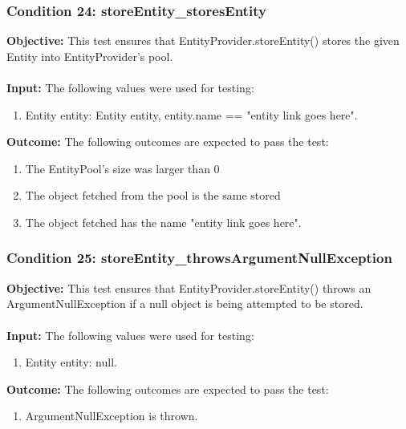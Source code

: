 \documentclass[a4paper,12pt]{article}
\begin{document}
		\subsubsection{Condition 24: storeEntity\_storesEntity}
			\textbf{Objective:} This test ensures that EntityProvider.storeEntity() stores the given Entity into EntityProvider's pool.\\\\
			\textbf{Input:} The following values were used for testing:
				\begin{enumerate}
					\item Entity entity: Entity entity, entity.name == "entity link goes here".
				\end{enumerate}
			\textbf{Outcome:} The following outcomes are expected to pass the test:
				\begin{enumerate}
					\item The EntityPool's size was larger than 0
					\item The object fetched from the pool is the same stored
					\item The object fetched has the name "entity link goes here".
				\end{enumerate}
		\subsubsection{Condition 25: storeEntity\_throwsArgumentNullException}
			\textbf{Objective:} This test ensures that EntityProvider.storeEntity() throws an ArgumentNullException if a null object is being attempted to be stored.\\\\
			\textbf{Input:} The following values were used for testing:
				\begin{enumerate}
					\item Entity entity: null.
				\end{enumerate}
			\textbf{Outcome:} The following outcomes are expected to pass the test:
				\begin{enumerate}
					\item ArgumentNullException is thrown.
				\end{enumerate}
\end{document}
